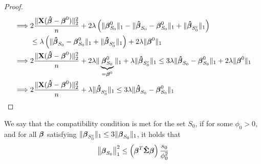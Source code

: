 \begin{proof}
\begin{align*}
        \implies & 2 \frac{\| \mathbf{X} (\boldsymbol{\hat{\beta}}-\boldsymbol{\beta}^{0})\|_{2}^{2}}{n} + 2 \lambda \left( \|\boldsymbol{\beta}_{S_{0}}^{0} \|_{1} - \|\boldsymbol{\hat{\beta}}_{S_{0}}-\boldsymbol{\beta}_{S_{0}}^{0} \|_{1}+ \|\boldsymbol{\hat{\beta}}_{S_{0}^{c}} \|_{1} \right)                                                               \\
                 & \leq \lambda \left( \| \boldsymbol{\hat{\beta}}_{S_{0}}-\boldsymbol{\beta}_{S_{0}}^{0} \|_{1} + \|\boldsymbol{\hat{\beta}}_{S_{0}^{c}} \|_{1} \right) + 2 \lambda \|\boldsymbol{\beta}^{0} \|_{1}                                                                                                         \\
        \implies & 2 \frac{\| \mathbf{X} (\boldsymbol{\hat{\beta}}-\boldsymbol{\beta}^{0})\|_{2}^{2}}{n} + 2 \lambda \|\underbrace{\boldsymbol{\beta}_{S_{0}}^{0}}_{= \boldsymbol{\beta}^0} \|_{1} + \lambda \|\boldsymbol{\hat{\beta}}_{S_{0}^{c}} \|_{1} \leq 3 \lambda \| \boldsymbol{\hat{\beta}}_{S_{0}}-\boldsymbol{\beta}_{S_{0}}^{0} \|_{1} + 2 \lambda \|\boldsymbol{\beta}^{0} \|_{1} \\
        \implies & 2\frac{ \|\mathbf{X} (\boldsymbol{\hat{\beta}}-\boldsymbol{\beta}^{0} ) \|_{2}^{2}}{n} + \lambda \|\boldsymbol{\hat{\beta}}_{S_{0}^{c}} \|_{1} \leq 3 \lambda \|\boldsymbol{\hat{\beta}}_{S_{0}}-\boldsymbol{\beta}_{S_{0}}^{0} \|_{1}
    \end{align*}
\end{proof}

\begin{definition}
    We say that the compatibility condition is met for the set $S_{0}$, if for some $\phi_{0}>0$, and for all $\boldsymbol{\beta}$ satisfying $ \|\boldsymbol{\beta}_{S_{0}^{c}} \|_{1} \leq 3 \|\boldsymbol{\beta}_{S_{0}} \|_{1}$, it holds that
    \begin{equation}
        \left\| \boldsymbol{\beta}_{S_{0}} \right\|_{1}^{2} \leq \left(\boldsymbol{\beta}^{T} \boldsymbol{\hat{\Sigma}} \boldsymbol{\beta}\right) \frac{s_{0}}{\phi_{0}^{2}}
    \end{equation}
\end{definition}

